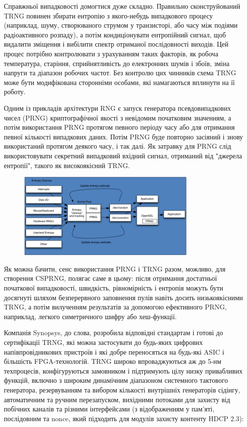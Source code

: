 Справжньої випадковості домогтися дуже складно. Правильно сконструйований TRNG повинен збирати ентропію з якого-небудь випадкового процесу (наприклад, шуму, створюваного струмом у транзисторі, або часу між подіями радіоактивного розпаду), а потім кондиціонувати ентропійний сигнал, щоб видалити зміщення і вибілити спектр отриманої послідовності виходів. Цей процес потрібно контролювати з урахуванням таких факторів, як робоча температура, старіння, сприйнятливість до електронних шумів і збоїв, зміна напруги та діапазон робочих частот. Без контролю цих чинників схема TRNG може бути модифікована сторонніми особами, які намагаються вплинути на її роботу.

Одним із прикладів архітектури RNG є запуск генератора псевдовипадкових чисел (PRNG) криптографічної якості з невідомим початковим значенням, а потім використання PRNG протягом певного періоду часу або для отримання певної кількості випадкових даних. Потім PRNG буде повторно засіяний і знову використаний протягом деякого часу, і так далі. Як затравку для PRNG слід використовувати секретний випадковий вхідний сигнал, отриманий від "джерела ентропії", такого як високоякісний TRNG.  

\begin{figure}[h]
  \centering
  \includegraphics[width=0.8\textwidth]{IMAGES/07.png}
  \label{fig:fig1}
\end{figure}

Як можна бачити, сенс використання PRNG і TRNG разом, можливо, для створення CSPRNG, полягає саме в цьому: після отримання достатньої початкової випадковості, швидкість, рівномірність і ентропія можуть бути досягнуті шляхом безперервного заповнення пулів навіть досить низькоякісними TRNG, а потім вилученням результатів за допомогою ефективного PRNG, наприклад, легкого симетричного шифру або хеш-функції.

Компанія Synopsys, до слова, розробила відповідні стандартам і готові до сертифікації TRNG, які можна застосувати до будь-яких цифрових напівпровідникових пристроїв і які добре переносяться на будь-які ASIC і більшість FPGA-технологій. TRNG широко впроваджуються аж до 5-нм техпроцесів, конфігуруються замовником і підтримують цілу низку привабливих функцій, включно з широким динамічним діапазоном системного тактового генератора, резервуванням та вибором кількості внутрішніх генераторів сідінгу, автоматичним та ручним перезапуском, вихідними потоками для захисту від побічних каналів та різними інтерфейсами (з відображенням у пам'яті, послідовним та nonce, який підходить для модулів захисту контенту HDCP 2.3):

